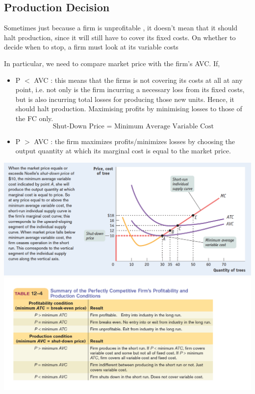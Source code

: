 \documentclass[english,course,draft]{Notes}
\begin{document}
{\newpage
\subsection{Production Decision}

\par{Sometimes just because a firm is unprofitable , it doesn't mean that it should halt production, since it will still have to cover its fixed costs. On whether to decide when to stop, a firm must look at its variable costs}

\par{In particular, we need to compare market price with the firm's AVC. If, }

\begin{itemize}
	\item P $<$ AVC : this means that the firms is not covering its costs at all at any point, i.e. not only is the firm incurring a necessary loss from its fixed costs, but is also incurring total losses for producing those new units. Hence, it should halt production. Maximising profits by minimising losses to those of the FC only. 
	$$\text{Shut-Down Price = Minimum Average Variable Cost}$$
	\item P $>$ AVC : the firm maximizes profits/minimizes losses by choosing the output quantity at which its marginal cost is equal to the market price.
\end{itemize}


\includegraphics[width=\textwidth]{profit3}
\includegraphics[width=\textwidth]{profitSum}

}
\end{document}
